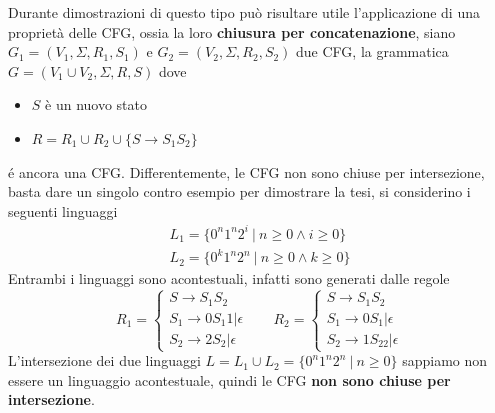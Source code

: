 \documentclass[10pt, letterpaper]{report}
\begin{document}
Durante dimostrazioni di questo tipo può risultare utile l'applicazione di una proprietà delle CFG, ossia la loro 
\textbf{chiusura per concatenazione}, siano $G_1=(V_1,\Sigma, R_1, S_1)$ e $G_2=(V_2,\Sigma, R_2, S_2)$ due CFG, la grammatica 
$G=(V_1\cup V_2,\Sigma, R, S)$ dove \begin{itemize}
    \item $S$ è un nuovo stato 
    \item $R=R_1\cup R_2\cup\{S\rightarrow S_1S_2\}$
\end{itemize}
é ancora una CFG.
\acc 
Differentemente, le CFG non sono chiuse per intersezione, basta dare un singolo contro esempio per dimostrare la tesi, si 
considerino i seguenti linguaggi 
$$ \begin{matrix}
    L_1=\{0^n1^n2^i \ | \ n\ge 0\land i\ge 0\}\\ 
    L_2=\{0^k1^n2^n \ | \ n\ge 0\land k\ge 0\}
\end{matrix}$$
Entrambi i linguaggi sono acontestuali, infatti sono generati dalle regole 
$$ R_1=\begin{cases}
    S\longrightarrow S_1S_2\\ 
    S_1\longrightarrow0S_1 1|\epsilon\\ 
    S_2 \longrightarrow 2S_2|\epsilon
\end{cases} \ \ \ \ \ \ \ \ R_2=\begin{cases}
    S\longrightarrow S_1S_2\\ 
    S_1\longrightarrow0S_1 |\epsilon\\ 
    S_2 \longrightarrow 1S_22|\epsilon
\end{cases}$$
L'intersezione dei due linguaggi $L=L_1\cup L_2 = \{0^n1^n2^n \ | \ n\ge 0\}$ sappiamo  non essere un linguaggio acontestuale, 
quindi le CFG \textbf{non sono chiuse per intersezione}.
\end{document}
